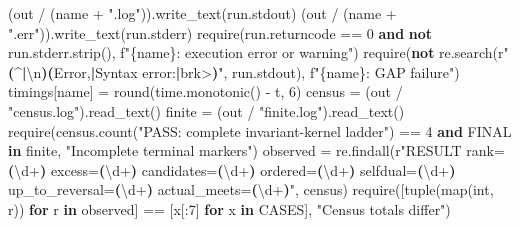 \documentclass[
  10pt,
  letterpaper,
]{article}
\newenvironment{Shaded}{}{}
\newcommand{\BuiltInTok}[1]{\textcolor[rgb]{0.00,0.50,0.00}{#1}}
\newcommand{\CharTok}[1]{\textcolor[rgb]{0.25,0.44,0.63}{#1}}
\newcommand{\ControlFlowTok}[1]{\textcolor[rgb]{0.00,0.44,0.13}{\textbf{#1}}}
\newcommand{\DecValTok}[1]{\textcolor[rgb]{0.25,0.63,0.44}{#1}}
\newcommand{\KeywordTok}[1]{\textcolor[rgb]{0.00,0.44,0.13}{\textbf{#1}}}
\newcommand{\NormalTok}[1]{#1}
\newcommand{\OperatorTok}[1]{\textcolor[rgb]{0.40,0.40,0.40}{#1}}
\newcommand{\SpecialCharTok}[1]{\textcolor[rgb]{0.25,0.44,0.63}{#1}}
\newcommand{\SpecialStringTok}[1]{\textcolor[rgb]{0.73,0.40,0.53}{#1}}
\newcommand{\StringTok}[1]{\textcolor[rgb]{0.25,0.44,0.63}{#1}}
\newcommand{\VerbatimStringTok}[1]{\textcolor[rgb]{0.25,0.44,0.63}{#1}}
\begin{document}
\begin{Shaded}
\begin{Highlighting}[]
\NormalTok{        (out }\OperatorTok{/}\NormalTok{ (name }\OperatorTok{+} \StringTok{".log"}\NormalTok{)).write\_text(run.stdout)}
\NormalTok{        (out }\OperatorTok{/}\NormalTok{ (name }\OperatorTok{+} \StringTok{".err"}\NormalTok{)).write\_text(run.stderr)}
\NormalTok{        require(run.returncode }\OperatorTok{==} \DecValTok{0} \KeywordTok{and} \KeywordTok{not}\NormalTok{ run.stderr.strip(), }\SpecialStringTok{f"}\SpecialCharTok{\{}\NormalTok{name}\SpecialCharTok{\}}\SpecialStringTok{: execution error or warning"}\NormalTok{)}
\NormalTok{        require(}\KeywordTok{not}\NormalTok{ re.search(}\VerbatimStringTok{r"}\KeywordTok{(}\DecValTok{\^{}}\ControlFlowTok{|}\CharTok{\textbackslash{}n}\KeywordTok{)(}\VerbatimStringTok{Error,}\ControlFlowTok{|}\VerbatimStringTok{Syntax error:}\ControlFlowTok{|}\VerbatimStringTok{brk\textgreater{}}\KeywordTok{)}\VerbatimStringTok{"}\NormalTok{, run.stdout), }\SpecialStringTok{f"}\SpecialCharTok{\{}\NormalTok{name}\SpecialCharTok{\}}\SpecialStringTok{: GAP failure"}\NormalTok{)}
\NormalTok{        timings[name] }\OperatorTok{=} \BuiltInTok{round}\NormalTok{(time.monotonic() }\OperatorTok{{-}}\NormalTok{ t, }\DecValTok{6}\NormalTok{)}
\NormalTok{    census }\OperatorTok{=}\NormalTok{ (out }\OperatorTok{/} \StringTok{"census.log"}\NormalTok{).read\_text()}
\NormalTok{    finite }\OperatorTok{=}\NormalTok{ (out }\OperatorTok{/} \StringTok{"finite.log"}\NormalTok{).read\_text()}
\NormalTok{    require(census.count(}\StringTok{"PASS: complete invariant{-}kernel ladder"}\NormalTok{) }\OperatorTok{==} \DecValTok{4} \KeywordTok{and}\NormalTok{ FINAL }\KeywordTok{in}\NormalTok{ finite, }\StringTok{"Incomplete terminal markers"}\NormalTok{)}
\NormalTok{    observed }\OperatorTok{=}\NormalTok{ re.findall(}\VerbatimStringTok{r"RESULT rank=}\KeywordTok{(}\DecValTok{\textbackslash{}d}\OperatorTok{+}\KeywordTok{)}\VerbatimStringTok{ excess=}\KeywordTok{(}\DecValTok{\textbackslash{}d}\OperatorTok{+}\KeywordTok{)}\VerbatimStringTok{ candidates=}\KeywordTok{(}\DecValTok{\textbackslash{}d}\OperatorTok{+}\KeywordTok{)}\VerbatimStringTok{ ordered=}\KeywordTok{(}\DecValTok{\textbackslash{}d}\OperatorTok{+}\KeywordTok{)}\VerbatimStringTok{ selfdual=}\KeywordTok{(}\DecValTok{\textbackslash{}d}\OperatorTok{+}\KeywordTok{)}\VerbatimStringTok{ up\_to\_reversal=}\KeywordTok{(}\DecValTok{\textbackslash{}d}\OperatorTok{+}\KeywordTok{)}\VerbatimStringTok{ actual\_meets=}\KeywordTok{(}\DecValTok{\textbackslash{}d}\OperatorTok{+}\KeywordTok{)}\VerbatimStringTok{"}\NormalTok{, census)}
\NormalTok{    require([}\BuiltInTok{tuple}\NormalTok{(}\BuiltInTok{map}\NormalTok{(}\BuiltInTok{int}\NormalTok{, r)) }\ControlFlowTok{for}\NormalTok{ r }\KeywordTok{in}\NormalTok{ observed] }\OperatorTok{==}\NormalTok{ [x[:}\DecValTok{7}\NormalTok{] }\ControlFlowTok{for}\NormalTok{ x }\KeywordTok{in}\NormalTok{ CASES], }\StringTok{"Census totals differ"}\NormalTok{)}

\end{Highlighting}
\end{Shaded}
\end{document}
